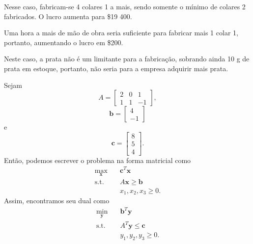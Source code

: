 \documentclass[a4paper]{report}
\begin{document}

Nesse caso, fabricam-se 4 colares 1 a mais, sendo somente o mínimo de colares 2 fabricados. O lucro aumenta para \$19 400.


Uma hora a mais de mão de obra seria suficiente para fabricar mais 1 colar 1, portanto, aumentando o lucro em \$200.


Neste caso, a prata não é um limitante para a fabricação, sobrando ainda 10 g de prata em estoque, portanto, não seria para a empresa adquirir mais prata.


Sejam \[
    A = \begin{bmatrix}
	2 & 0 & 1 \\
	1 & 1 & -1
    \end{bmatrix} 
,\] \[
\bm{b} = \begin{bmatrix} 
    4 \\
    -1
\end{bmatrix} 
\] e \[
\bm{c} = \begin{bmatrix} 
    8 \\
    5 \\
    4
\end{bmatrix} 
.\] Então, podemos escrever o problema na forma matricial como
\begin{align*}
    \max_{\bm{x}} \quad & \bm{c}^{T}\bm{x} \\
    \textrm{s.t.} \quad & A\bm{x} \ge \bm{b} \\
      & x_1,x_2,x_3 \ge 0
.\end{align*}
Assim, encontramos seu dual como
\begin{align*}
    \min_{\bm{y}} \quad & \bm{b}^{T} \bm{y} \\
    \textrm{s.t.} \quad & A^{T}\bm{y} \le \bm{c} \\
      & y_1,y_2,y_3 \ge 0
.\end{align*}
\end{document}
